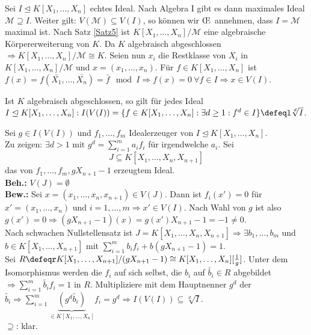 \begin{Bew}
  Sei $I \trianglelefteq K[X_1, \dots, X_n]$ echtes Ideal. Nach Algebra I gibt es dann maximales Ideal $\mathcal{M} \supseteq I$. Weiter gilt: $V(\mathcal{M}) \subseteq V(I)$, so können wir \OE\ annehmen, dass $I = \mathcal{M}$ maximal ist.
  Nach Satz \ref{Satz5} ist $K[X_1, \dots, X_n]/\mathcal{M}$ eine algebraische Körpererweiterung von $K$.
  Da $K$ algebraisch abgeschlossen $\Rightarrow K[X_1, \dots, X_n]/\mathcal{M} \cong K$.
  Seien nun $x_i$ die Restklasse von $X_i$ in $K[X_1, \dots, X_n]/\mathcal{M}$ und $x = (x_1, \dots, x_n)$.
  Für $f \in K[X_1, \dots, X_n]$ ist $f(x) = f(\bar{X_1}, \dots, \bar{X_n}) = \bar{f} \mod I \Rightarrow f(x) = 0\ \forall f \in I \Rightarrow x \in V(I)$.
\end{Bew}

\begin{nnSatz}
  Ist $K$ algebraisch abgeschlossen, so gilt für jedes Ideal $I \trianglelefteq K[X_1, \dots, X_n]: I(V(I)) = \{ f \in K[X_1, \dots, X_n]: \exists d \ge 1: f^d \in I \} \defeql \sqrt[d]{I}$.
\end{nnSatz}

\begin{Bew}
  Sei $g \in I(V(I))$ und $f_1, \dots, f_m$ Idealerzeuger von $I \trianglelefteq K[X_1, \dots, X_n]$.\\
  Zu zeigen: $\exists d > 1 \text{ mit } g^d = \sum_{i = 1}^m a_i f_i$ für irgendwelche $a_i$.
  Sei 
  \[
  J \subseteq K[X_1, \dots, X_n, X_{n+1}]
  \]
  das von $f_1, \dots, f_m, gX_{n+1}-1$ erzeugtem Ideal.\\
  \textbf{Beh.:} $V(J) = \emptyset$\\
  \textbf{Bew.:} Sei $x = (x_1, \dots, x_n, x_{n+1}) \in V(J)$.
  Dann ist $f_i(x') = 0$ für $x' = (x_1, \dots, x_n)$ und $i = 1, \dots, m \Rightarrow x' \in V(I)$.
  Nach Wahl von $g$ ist also $g(x') = 0 \Rightarrow (gX_{n+1}-1)(x)
  = g(x') X_{n+1} - 1 = -1 \not= 0$.\\
  Nach schwachen Nullstellensatz ist $J = K[X_1, \dots, X_n,X_{n+1}] \Rightarrow \exists b_1,
  \dots, b_m$ und $b \in K[X_1, \dots, X_{n+1}]$ mit $\sum_{i=1}^m b_i f_i + b(gX_{n+1} - 1) = 1$.\\
  Sei $R \defeqr K[X_1, \dots, X_{n+1}]/ (gX_{n+1} - 1) \cong K[X_1, \dots, X_n][\frac{1}{g}]$. Unter dem Isomorphismus werden die $f_i$ auf sich selbst, die $b_i$ auf $\tilde{b_i} \in R$ abgebildet $\Rightarrow \sum_{i = 1}^m \tilde{b_i} f_i = 1 \text{ in } R$.
  Multipliziere mit dem Hauptnenner $g^d$ der $\tilde{b_i} \Rightarrow \sum_{i = 1}^m \underset{\in K[X_1, \dots, X_n]}{\underbrace{(g^d \tilde{b_i})}} f_i = g^d \Rightarrow I(V(I)) \subseteq \sqrt[d]{I}$.\\
  \glqq$\supseteq$\grqq: klar.
\end{Bew}
